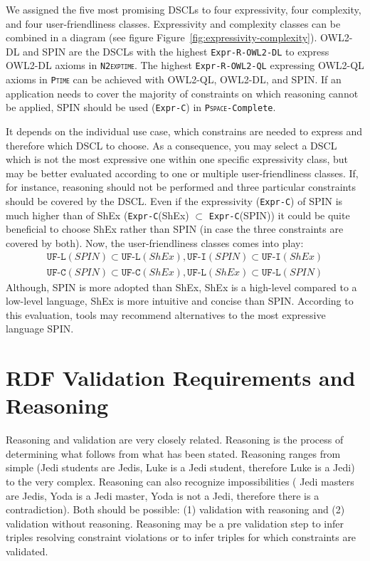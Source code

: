 \documentclass{llncs}
\newcommand{\ms}[1]{\texttt{#1}}
\begin{document}
We assigned the five most promising DSCLs to four expressivity, four complexity, and four user-friendliness classes.
Expressivity and complexity classes can be combined in a diagram (see figure Figure~\ref{fig:expressivity-complexity}).
OWL2-DL and SPIN are the DSCLs with the highest \ms{Expr-R-OWL2-DL} to express OWL2-DL axioms in \ms{\textsc{N2exptime}}.
The highest \ms{Expr-R-OWL2-QL} expressing OWL2-QL axioms in \ms{\textsc{Ptime}} can be achieved with OWL2-QL, OWL2-DL, and SPIN.
If an application needs to cover the majority of constraints on which reasoning cannot be applied, SPIN should be used (\ms{Expr-C}) in \ms{\textsc{Pspace}-Complete}.

It depends on the individual use case, which constrains are needed to express and therefore which DSCL to choose.
As a consequence, you may select a DSCL which is not the most expressive one within one specific expressivity class, 
but may be better evaluated according to one or multiple user-friendliness classes.
If, for instance, reasoning should not be performed and three particular constraints should be covered by the DSCL.
Even if the expressivity (\ms{Expr-C}) of SPIN is much higher than of ShEx (\ms{Expr-C}(ShEx) $\subset$ \ms{Expr-C}(SPIN)) 
it could be quite beneficial to choose ShEx rather than SPIN (in case the three constraints are covered by both).
Now, the user-friendliness classes comes into play:
\begin{eqnarray*}
\ms{UF-L}(SPIN) \subset \ms{UF-L}(ShEx), \ms{UF-I}(SPIN) \subset \ms{UF-I}(ShEx) \\
\ms{UF-C}(SPIN) \subset \ms{UF-C}(ShEx), \ms{UF-L}(ShEx) \subset \ms{UF-L}(SPIN)
\end{eqnarray*}
Although, SPIN is more adopted than ShEx, ShEx is a high-level compared to a low-level language, ShEx is more intuitive and concise than SPIN.
According to this evaluation, tools may recommend alternatives to the most expressive language SPIN.  

\section{RDF Validation Requirements and Reasoning}
\label{sec:rdf-validation-requirements-and-reasoning}

Reasoning and validation are very closely related. 
Reasoning is the process of determining what follows from what has been
stated.  Reasoning ranges from simple (Jedi students are Jedis, Luke is a Jedi student, therefore Luke is a Jedi) to the very complex. Reasoning can
also recognize impossibilities ( Jedi masters are Jedis, Yoda is a Jedi master, Yoda
is not a Jedi, therefore there is a contradiction). 
Both should be possible: (1) validation with reasoning and (2) validation without reasoning. 
Reasoning may be a pre validation step to infer triples resolving constraint violations or to infer triples for which constraints are validated.
\end{document}
